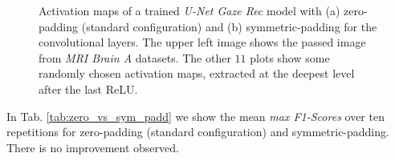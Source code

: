 \begin{figure}[!htbp]
  \centering
  \hfill
  \caption[Activation maps symmetric padding]{Activation maps of a trained \textit{U-Net Gaze Rec} model with (a) zero-padding (standard configuration) and (b) symmetric-padding for the convolutional layers. The upper left image shows the passed image from \textit{MRI Brain A} datasets. The other $11$ plots show some randomly chosen activation maps, extracted at the deepest level after the last ReLU.}
  \label{fig:activatiom_maps_sym}
\end{figure}

In Tab. \ref{tab:zero_vs_sym_padd} we show the mean \textit{max F1-Scores} over ten repetitions for zero-padding (standard configuration) and symmetric-padding. There is no improvement observed.

